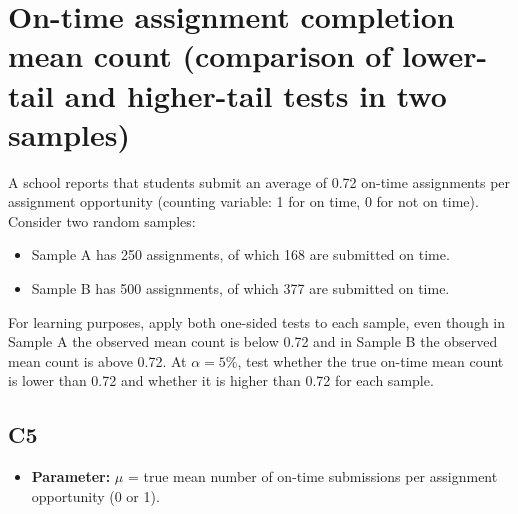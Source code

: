 \begin{center}

\end{center}


\begin{center}

\end{center}



\begin{center}
	
\end{center}



\section{On-time assignment completion mean count (comparison of lower-tail and higher-tail tests in two samples)}
A school reports that students submit an average of 0.72 on-time assignments per assignment opportunity (counting variable: 1 for on time, 0 for not on time). Consider two random samples:
\begin{itemize}
	\item Sample A has 250 assignments, of which 168 are submitted on time.
	\item Sample B has 500 assignments, of which 377 are submitted on time.
\end{itemize}
For learning purposes, apply both one-sided tests to each sample, even though in Sample A the observed mean count is below 0.72 and in Sample B the observed mean count is above 0.72. At \(\alpha=5\%\), test whether the true on-time mean count is lower than 0.72 and whether it is higher than 0.72 for each sample.

\subsection*{C5}
\begin{itemize}
	\item \textbf{Parameter:} \(\mu\) = true mean number of on-time submissions per assignment opportunity (0 or 1).
\end{itemize}

